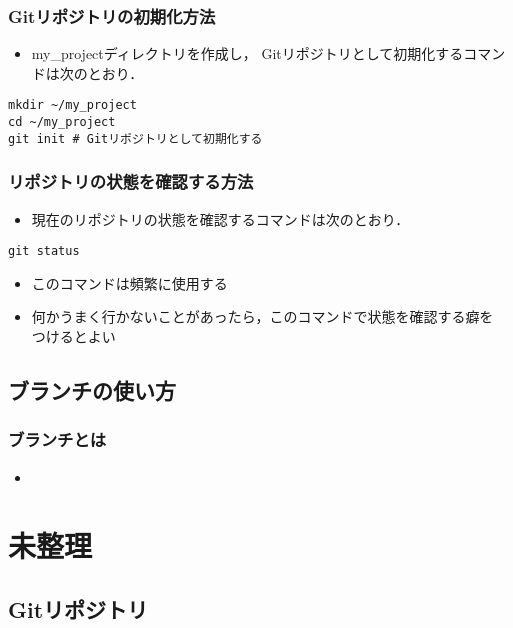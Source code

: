 \documentclass[a4paper,twoside,twocolumn]{bxjsarticle}
\begin{document}
\subsubsection{Gitリポジトリの初期化方法}
\label{sec-1-2-3}
\begin{itemize}
\item my\_projectディレクトリを作成し，
  Gitリポジトリとして初期化するコマンドは次のとおり．
\end{itemize}

\begin{verbatim}
mkdir ~/my_project
cd ~/my_project
git init # Gitリポジトリとして初期化する
\end{verbatim}

\subsubsection{リポジトリの状態を確認する方法}
\label{sec-1-2-4}
\begin{itemize}
\item 現在のリポジトリの状態を確認するコマンドは次のとおり．
\end{itemize}

\begin{verbatim}
git status
\end{verbatim}

\begin{itemize}
\item このコマンドは頻繁に使用する
\item 何かうまく行かないことがあったら，このコマンドで状態を確認する癖を
つけるとよい
\end{itemize}
\subsection{ブランチの使い方}
\label{sec-1-3}
\subsubsection{ブランチとは}
\label{sec-1-3-1}
\begin{itemize}
\item 
\end{itemize}

\section{未整理}
\label{sec-2}
\subsection{Gitリポジトリ}
\label{sec-2-1}
\end{document}
